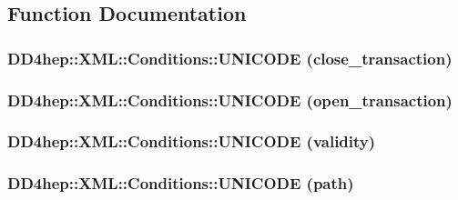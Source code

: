\subsection{Function Documentation}
\hypertarget{namespace_d_d4hep_1_1_x_m_l_1_1_conditions_ae58987a149ce1c597ae2c64aab52892a}{
\subsubsection[{UNICODE}]{\setlength{\rightskip}{0pt plus 5cm}DD4hep::XML::Conditions::UNICODE (close\_\-transaction)}}
\label{namespace_d_d4hep_1_1_x_m_l_1_1_conditions_ae58987a149ce1c597ae2c64aab52892a}
\hypertarget{namespace_d_d4hep_1_1_x_m_l_1_1_conditions_a9e72d71de115bf1f93f71ae147c66f8d}{
\subsubsection[{UNICODE}]{\setlength{\rightskip}{0pt plus 5cm}DD4hep::XML::Conditions::UNICODE (open\_\-transaction)}}
\label{namespace_d_d4hep_1_1_x_m_l_1_1_conditions_a9e72d71de115bf1f93f71ae147c66f8d}
\hypertarget{namespace_d_d4hep_1_1_x_m_l_1_1_conditions_a4b1aedbbdeb90f5760cb652b73627e50}{
\subsubsection[{UNICODE}]{\setlength{\rightskip}{0pt plus 5cm}DD4hep::XML::Conditions::UNICODE (validity)}}
\label{namespace_d_d4hep_1_1_x_m_l_1_1_conditions_a4b1aedbbdeb90f5760cb652b73627e50}
\hypertarget{namespace_d_d4hep_1_1_x_m_l_1_1_conditions_a5dba8de772bb2c909d53918606865cb9}{
\subsubsection[{UNICODE}]{\setlength{\rightskip}{0pt plus 5cm}DD4hep::XML::Conditions::UNICODE (path)}}
\label{namespace_d_d4hep_1_1_x_m_l_1_1_conditions_a5dba8de772bb2c909d53918606865cb9}
